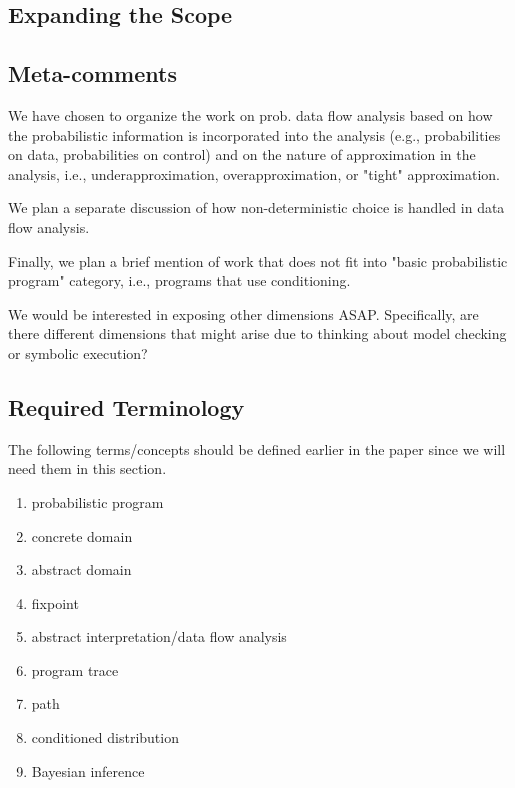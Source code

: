 
\subsection{Expanding the Scope}

\subsection{Meta-comments}

We have chosen to organize the work on prob. data flow analysis based 
on how the probabilistic information is incorporated into the analysis
(e.g., probabilities on data, probabilities on control)
and on the nature of approximation in the analysis, 
i.e., underapproximation, overapproximation, or "tight" approximation.

We plan a separate discussion of how non-deterministic choice is
handled in data flow analysis.

Finally, we plan a brief mention of work that does not fit into 
"basic probabilistic program" category, i.e., programs that use
conditioning.

We would be interested in exposing other dimensions ASAP.  Specifically,
are there different dimensions that might arise due to thinking about 
model checking or symbolic execution?

\subsection{Required Terminology}

The following terms/concepts should be defined earlier in the paper
since we will need them in this section.

\begin{enumerate}

 \item probabilistic program
 \item concrete domain
 \item abstract domain
 \item fixpoint
 \item abstract interpretation/data flow analysis
 \item program trace
 \item path
 \item conditioned distribution
 \item Bayesian inference

\end{enumerate}

